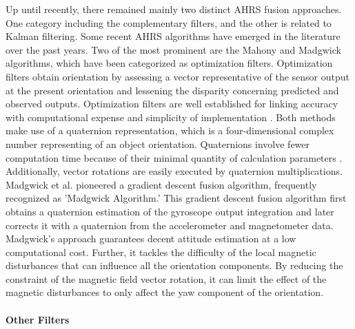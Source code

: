 Up until recently, there remained mainly two distinct AHRS fusion approaches. One category including the complementary filters, and the other is related to Kalman filtering. Some recent AHRS algorithms have emerged in the literature over the past years. Two of the most prominent are the Mahony and Madgwick algorithms, which have been categorized as optimization filters. Optimization filters obtain orientation by assessing a vector representative of the sensor output at the present orientation and lessening the disparity concerning predicted and observed outputs. Optimization filters are well established for linking accuracy with computational expense and simplicity of implementation \cite{madgwick2020extended}.
Both methods make use of a quaternion representation, which is a four-dimensional complex number representing of an object orientation. Quaternions involve fewer computation time because of their minimal quantity of calculation parameters \cite{ludwig2018comparison}. Additionally, vector rotations are easily executed by quaternion multiplications.
Madgwick et al. \cite{madgwick2010efficient} pioneered a gradient descent fusion algorithm, frequently recognized as 'Madgwick Algorithm.' This gradient descent fusion algorithm first obtains a quaternion estimation of the gyroscope output integration and later corrects it with a quaternion from the accelerometer and magnetometer data. Madgwick's approach guarantees decent attitude estimation at a low computational cost. Further, it tackles the difficulty of the local magnetic disturbances that can influence all the orientation components. By reducing the constraint of the magnetic field vector rotation, it can limit the effect of the magnetic disturbances to only affect the yaw component of the orientation.

\paragraph{Other Filters}
